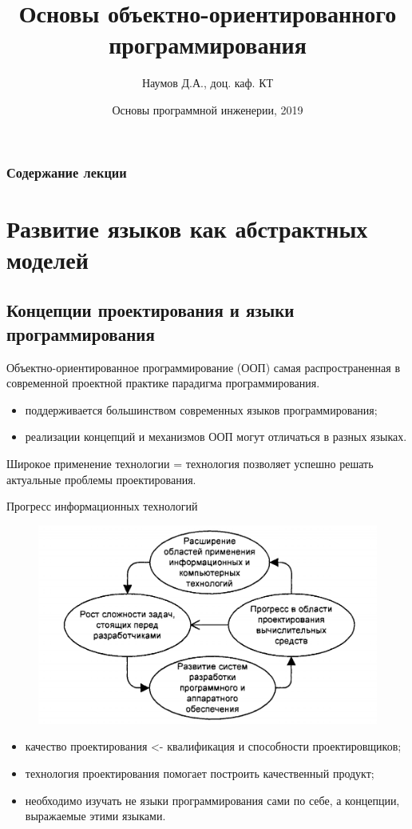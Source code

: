 \documentclass{beamer}
\title[Software Design]{Основы объектно-ориентированного программирования}
\author{Наумов Д.А., доц. каф. КТ}
\date[16.09.2019] {Основы программной инженерии, 2019}
\begin{document}
\begin{frame}
  \titlepage
\end{frame}
  
\begin{frame}
  \frametitle{Содержание лекции}
  \tableofcontents  
\end{frame}
  
\section{Развитие языков как абстрактных моделей}

\subsection{Концепции проектирования и языки программирования}

\begin{frame}
\begin{block}{Объектно-ориентированное программирование (ООП)}
самая распространенная в современной проектной практике парадигма программирования. 
\end{block}
\begin{itemize}
\item поддерживается большинством современных языков программирования;
\item реализации концепций и механизмов ООП могут отличаться в разных языках.
\end{itemize}
Широкое применение технологии = технология позволяет успешно решать актуальные проблемы проектирования.
\end{frame}

\begin{frame}[t]{Прогресс информационных технологий}
\begin{figure}[h]
\centering
\includegraphics[scale=0.25]{images/lec04-pic01.png}
\end{figure}
\begin{itemize}
\item качество проектирования <- квалификация и способности проектировщиков;
\item технология проектирования помогает построить качественный продукт;
\item необходимо изучать не языки программирования сами по себе, а концепции, выражаемые этими языками.
\end{itemize}
\end{frame}
\end{document}
